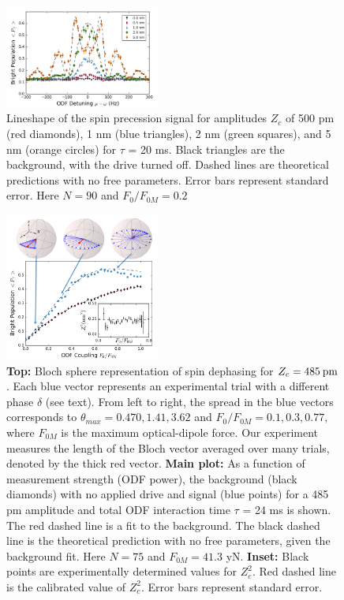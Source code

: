 \documentclass[aps,prl,twocolumn,superscriptaddress,floatfix,nofootinbib]{revtex4-1}
\begin{document}
\begin{figure}
    \centering
    \includegraphics[width=0.45\textwidth]{lineshape}
  \caption{Lineshape of the spin precession signal for amplitudes $Z_c$ of 500 pm (red diamonds), 1 nm (blue triangles), 2 nm (green squares), and 5 nm (orange circles) for $\tau$ = 20 ms. Black triangles are the background, with the drive turned off. Dashed lines are theoretical predictions with no free parameters. Error bars represent standard error. Here $N = 90$ and $F_{0}/F_{0M} = 0.2$}\label{lineshape}
\end{figure}
\begin{figure}
    \centering
    \includegraphics[width=0.45\textwidth]{measurement_strength_inset_z2_485}
  \caption{\textbf{Top:} Bloch sphere representation of spin dephasing for $Z_{c} = 485\: \rm{pm}$. Each blue vector represents an experimental trial with a different phase $\delta$ (see text). From left to right, the spread in the blue vectors corresponds to $\theta_{max} = 0.470, 1.41, 3.62$ and $F_{0}/F_{0M} = 0.1,0.3,0.77$, where $F_{0M}$ is the maximum optical-dipole force. Our experiment measures the length of the Bloch vector averaged over many trials, denoted by the thick red vector. \textbf{Main plot:} As a function of measurement strength (ODF power), the background (black diamonds) with no applied drive and signal (blue points) for a 485 pm amplitude and total ODF interaction time $\tau$ = 24 ms is shown. The red dashed line is a fit to the background. The black dashed line is the theoretical prediction with no free parameters, given the background fit. Here $N = 75$ and $F_{0M} = 41.3$ yN. \textbf{Inset:} Black points are experimentally determined values for $Z_{c}^2$. Red dashed line is the calibrated value of $Z_{c}^{2}$. Error bars represent standard error.}\label{Meas_stren}
\end{figure}
\end{document}

